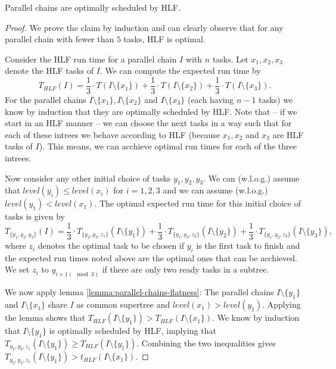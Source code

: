 \begin{theorem}
  Parallel chains are optimally scheduled by HLF.
\end{theorem}

\begin{proof}
  \newcommand{\iminus}[1]{I\setminus\{#1\}}
  We prove the claim by induction and can clearly observe that for any parallel chain with fewer than $5$ tasks, HLF is optimal. 
  
  Consider the HLF run time for a parallel chain $I$ with $n$ tasks. Let $x_1,x_2,x_3$ denote the HLF tasks of $I$. We can compute the expected run time by
  \begin{equation*}
    T_{HLF}(I) = 
    \frac{1}{3} \cdot T(\iminus{x_1}) +
    \frac{1}{3} \cdot T(\iminus{x_2}) +
    \frac{1}{3} \cdot T(\iminus{x_3})
    .
  \end{equation*}
  For the parallel chains $\iminus{x_1}, \iminus{x_2}$ and $\iminus{x_3}$ (each having $n-1$ tasks) we know by induction that they are optimally scheduled by HLF. Note that -- if we start in an HLF manner -- we can choose the next tasks in a way such that for each of these intrees we behave according to HLF (because $x_1, x_2$ and $x_3$ are HLF tasks of $I$). This means, we can acchieve optimal run times for each of the three intrees.

  Now consider any other initial choice of tasks $y_1,y_2,y_3$. We can (w.l.o.g.) assume that $level(y_i)\leq level(x_i)$ for $i=1,2,3$ and we can assume (w.l.o.g.) $level(y_1) < level(x_1)$. The optimal expected run time for this initial choice of tasks is given by
  \begin{equation*}
    T_{\{y_1,y_2,y_3\}}(I) = 
    \frac{1}{3} \cdot T_{\{y_2,y_3,z_1\}}(\iminus{y_1}) +
    \frac{1}{3} \cdot T_{\{y_1,y_3,z_2\}}(\iminus{y_2}) +
    \frac{1}{3} \cdot T_{\{y_1,y_2,z_3\}}(\iminus{y_3})
    ,
  \end{equation*}
  where $z_i$ denotes the optimal task to be chosen if $y_i$ is the first task to finish and the expected run times noted above are the optimal ones that can be acchieved. We set $z_i$ to $y_{i+1(\mod 3)}$ if there are only two ready tasks in a subtree.
  
  We now apply lemma \ref{lemma:parallel-chains-flatness}: The parallel chains $\iminus{y_1}$ and $\iminus{x_1}$ share $I$ as common supertree and $level(x_1) > level(y_1)$. Applying the lemma shows that $T_{HLF}(\iminus{y_1}) > T_{HLF}(\iminus{x_1})$. We know by induction that $\iminus{y_1}$ is optimally scheduled by HLF, implying that $T_{y_2,y_3,z_1}(\iminus{y_1}) \geq T_{HLF}(\iminus{y_1})$. Combining the two inequalities gives $T_{y_2,y_3,z_1}(\iminus{y_1}) > t_{HLF}(\iminus{x_1})$.


\end{proof}
